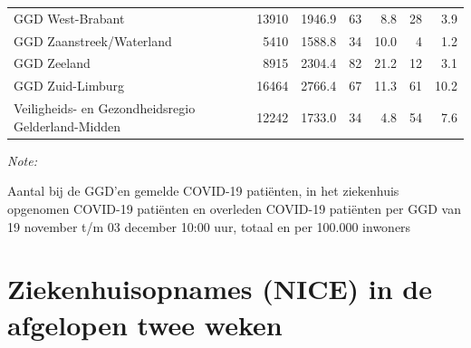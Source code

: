 \documentclass[
  english,
  man,floatsintext]{apa6}
\begin{document}
\begin{table}
\begin{threeparttable}
\begin{tabular}{lrrrrrr}
GGD West-Brabant & 13910 & 1946.9 & 63 & 8.8 & 28 & 3.9\\
GGD Zaanstreek/Waterland & 5410 & 1588.8 & 34 & 10.0 & 4 & 1.2\\
GGD Zeeland & 8915 & 2304.4 & 82 & 21.2 & 12 & 3.1\\
GGD Zuid-Limburg & 16464 & 2766.4 & 67 & 11.3 & 61 & 10.2\\
Veiligheids- en Gezondheidsregio Gelderland-Midden & 12242 & 1733.0 & 34 & 4.8 & 54 & 7.6\\
\bottomrule
\end{tabular}
\begin{tablenotes}
\item \textit{Note: } 
\item Aantal bij de GGD’en gemelde COVID-19 patiënten, in het ziekenhuis opgenomen COVID-19 patiënten en overleden COVID-19 patiënten per GGD van 19 november t/m 03 december 10:00 uur, totaal en per 100.000 inwoners
\end{tablenotes}
\end{threeparttable}
\endgroup{}
\end{table}

\newpage

\hypertarget{ziekenhuisopnames-nice-in-de-afgelopen-twee-weken}{%
\section{Ziekenhuisopnames (NICE) in de afgelopen twee weken}\label{ziekenhuisopnames-nice-in-de-afgelopen-twee-weken}}
\end{document}
